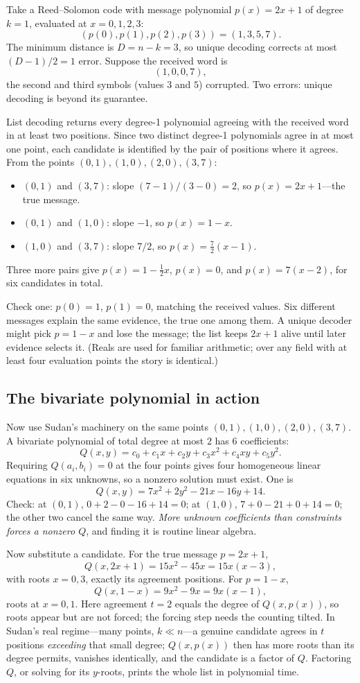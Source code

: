 Take a Reed--Solomon code with message polynomial $p(x)=2x+1$ of degree $k=1$, evaluated at $x=0,1,2,3$:
\[
(p(0),p(1),p(2),p(3))=(1,3,5,7).
\]
The minimum distance is $D=n-k=3$, so unique decoding corrects at most $(D-1)/2=1$ error. Suppose the received word is
\[
(1,0,0,7),
\]
the second and third symbols (values $3$ and $5$) corrupted. Two errors: unique decoding is beyond its guarantee.

List decoding returns every degree-1 polynomial agreeing with the received word in at least two positions. Since two distinct degree-1 polynomials agree in at most one point, each candidate is identified by the pair of positions where it agrees. From the points $(0,1),(1,0),(2,0),(3,7)$:
\begin{itemize}
\item $(0,1)$ and $(3,7)$: slope $(7-1)/(3-0)=2$, so $p(x)=2x+1$---the true message.
\item $(0,1)$ and $(1,0)$: slope $-1$, so $p(x)=1-x$.
\item $(1,0)$ and $(3,7)$: slope $7/2$, so $p(x)=\frac72(x-1)$.
\end{itemize}
Three more pairs give $p(x)=1-\frac12x$, $p(x)=0$, and $p(x)=7(x-2)$, for six candidates in total.

Check one: $p(0)=1$, $p(1)=0$, matching the received values. Six different messages explain the same evidence, the true one among them. A unique decoder might pick $p=1-x$ and lose the message; the list keeps $2x+1$ alive until later evidence selects it. (Reals are used for familiar arithmetic; over any field with at least four evaluation points the story is identical.)

\subsection{The bivariate polynomial in action}

Now use Sudan's machinery on the same points $(0,1),(1,0),(2,0),(3,7)$. A bivariate polynomial of total degree at most $2$ has $6$ coefficients:
\[
Q(x,y)=c_0+c_1x+c_2y+c_3x^2+c_4xy+c_5y^2.
\]
Requiring $Q(a_i,b_i)=0$ at the four points gives four homogeneous linear equations in six unknowns, so a nonzero solution must exist. One is
\[
Q(x,y)=7x^2+2y^2-21x-16y+14.
\]
Check: at $(0,1)$, $0+2-0-16+14=0$; at $(1,0)$, $7+0-21+0+14=0$; the other two cancel the same way. \emph{More unknown coefficients than constraints forces a nonzero $Q$}, and finding it is routine linear algebra.

Now substitute a candidate. For the true message $p=2x+1$,
\[
Q(x,2x+1)=15x^2-45x=15x(x-3),
\]
with roots $x=0,3$, exactly its agreement positions. For $p=1-x$,
\[
Q(x,1-x)=9x^2-9x=9x(x-1),
\]
roots at $x=0,1$. Here agreement $t=2$ equals the degree of $Q(x,p(x))$, so roots appear but are not forced; the forcing step needs the counting tilted. In Sudan's real regime---many points, $k\ll n$---a genuine candidate agrees in $t$ positions \emph{exceeding} that small degree; $Q(x,p(x))$ then has more roots than its degree permits, vanishes identically, and the candidate is a factor of $Q$. Factoring $Q$, or solving for its $y$-roots, prints the whole list in polynomial time.

